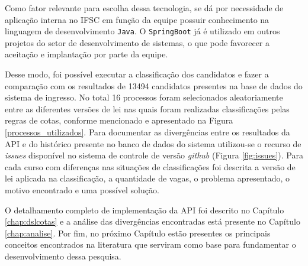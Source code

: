 Como fator relevante para escolha dessa tecnologia, se dá por necessidade de aplicação interna no \gls{IFSC} em função da equipe possuir conhecimento na linguagem de desenvolvimento \texttt{Java}. O \texttt{SpringBoot} já é utilizado em outros projetos do setor de desenvolvimento de sistemas, o que pode favorecer a aceitação e implantação por parte da equipe.

Desse modo, foi possível executar a classificação dos candidatos e fazer a comparação com os resultados de 13494 candidatos presentes na base de dados do sistema de ingresso. No total 16 processos foram selecionados aleatoriamente entre as diferentes versões de lei nas quais foram realizadas classificações pelas regras de cotas, conforme mencionado e apresentado na Figura \ref{processos_utilizados}. Para documentar as divergências entre os resultados da \gls{API} e do histórico presente no banco de dados do sistema utilizou-se o recurso de \textit{issues} disponível no sistema de controle de versão \textit{github} (Figura \ref{fig:issues}). Para cada curso com diferenças nas situações de classificações foi descrita a versão de lei aplicada na classificação, a quantidade de vagas, o problema apresentado, o motivo encontrado e uma possível solução.




O detalhamento completo de implementação da \gls{API} foi descrito no Capítulo \ref{chap:dslcotas} e a análise das divergências encontradas está presente no Capítulo \ref{chap:analise}. Por fim, no próximo Capítulo estão presentes os principais conceitos encontrados na literatura que serviram como base para fundamentar o desenvolvimento dessa pesquisa.